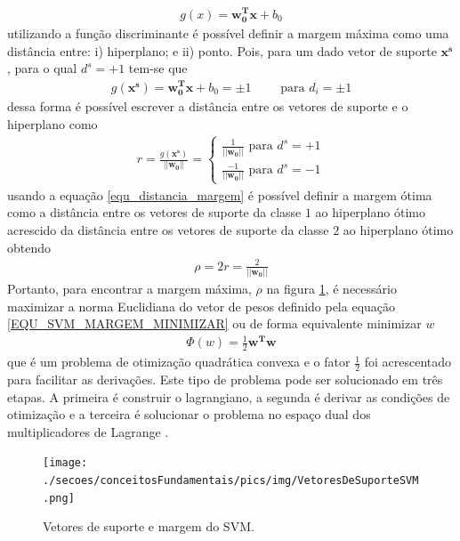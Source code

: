 \begin{align}
g(x) = \mathbf{w^{T}_{0}}\mathbf{x} + b_{0} 							\label{EQU_SVM_FUNCAO_DISCRIMINANTE}
\end{align}
utilizando a função discriminante é possível definir a margem máxima como uma distância entre: i) hiperplano; e ii) ponto. Pois, para um dado vetor de suporte \(\mathbf{x^{s}}\), para o qual \(d^{s} = +1\) tem-se que
\begin{align}
g(\mathbf{x^{s}}) = \mathbf{w^{T}_{0}}\mathbf{x} + b_{0} = \pm 1 \qquad \textrm{ para } d_{i} = \pm 1
\end{align}
dessa forma é possível escrever a distância entre os vetores de suporte e o hiperplano como
\begin{align}
r = \frac{g(\mathbf{x^{s}})}{||\mathbf{w_{0}}||} = 	\begin{cases} \label{equ_distancia_margem}
														\frac{1}{||\mathbf{w_{0}}||}  \textrm{ para } d^{s} = +1 \\
														\frac{-1}{||\mathbf{w_{0}}||} \textrm{ para } d^{s} = -1
													\end{cases}
\end{align}
usando a equação \eqref{equ_distancia_margem} é possível definir a margem ótima como a distância entre os vetores de suporte da classe \(1\) ao hiperplano ótimo acrescido da distância entre os vetores de suporte da classe \(2\) ao hiperplano ótimo obtendo
\begin{align}
\rho = 2r = \frac{2}{||\mathbf{w_{0}}||} \label{EQU_SVM_MARGEM_MINIMIZAR}
\end{align}
Portanto, para encontrar a margem máxima, \(\rho\) na figura \ref{FIGURA_SVM_Vetores_Suporte}, é necessário maximizar a norma Euclidiana do vetor de pesos definido pela equação \eqref{EQU_SVM_MARGEM_MINIMIZAR} ou de forma equivalente minimizar \(w\)
\begin{align}  
\Phi(w) = \frac{1}{2}\mathbf{w^{T}}\mathbf{w} \label{EQU_SVM_MARGEM_EQUIVALENTE_MAXIMIZAR}
\end{align}
que é um problema de otimização quadrática convexa e o fator \(\frac{1}{2}\) foi acrescentado para facilitar as derivações. Este tipo de problema pode ser solucionado em três etapas. A primeira é construir o lagrangiano, a segunda é derivar as condições de otimização e a terceira é solucionar o problema no espaço dual dos multiplicadores de Lagrange \cite{Haykin2007}.
\begin{figure}[hbt]
  \centering
  \caption{Vetores de suporte e margem do SVM.}
  \texttt{[image: ./secoes/conceitosFundamentais/pics/img/VetoresDeSuporteSVM.png]}
  \label{FIGURA_SVM_Vetores_Suporte}
\end{figure}
